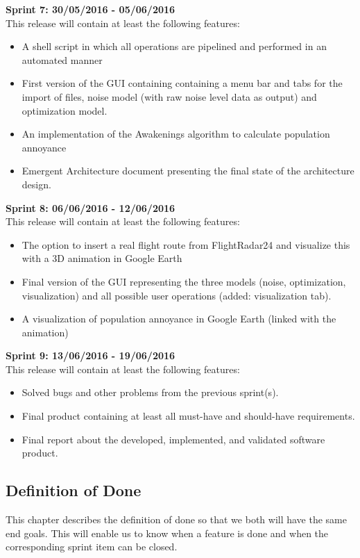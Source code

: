 \documentclass[a4paper,english,fleqn]{exam}
\begin{document}
\textbf{Sprint 7: 30/05/2016 - 05/06/2016} \\
This release will contain at least the following features:
\begin{itemize}
\item A shell script in which all operations are pipelined and performed in an automated manner
\item First version of the GUI containing containing a menu bar and tabs for the import of files, noise model (with raw noise level data as output) and optimization model.
\item An implementation of the Awakenings algorithm to calculate population annoyance
\item Emergent Architecture document presenting the final state of the architecture design. 
\end{itemize}

\textbf{Sprint 8: 06/06/2016 - 12/06/2016} \\
This release will contain at least the following features:
\begin{itemize}
\item The option to insert a real flight route from FlightRadar24 and visualize this with a 3D animation in Google Earth
\item Final version of the GUI representing the three models (noise, optimization, visualization) and all possible user operations (added: visualization tab).
\item A visualization of population annoyance in Google Earth (linked with the animation)
\end{itemize}

\textbf{Sprint 9: 13/06/2016 - 19/06/2016} \\
This release will contain at least the following features:
\begin{itemize}
\item Solved bugs and other problems from the previous sprint(s).
\item Final product containing at least all must-have and should-have requirements.
\item Final report about the developed, implemented, and validated software product.
\end{itemize}


\newpage 
\subsection{Definition of Done}
This chapter describes the definition of done so that we both will have the same end goals. This will enable us to know when a feature is done and when the corresponding sprint item can be closed.
\end{document}
